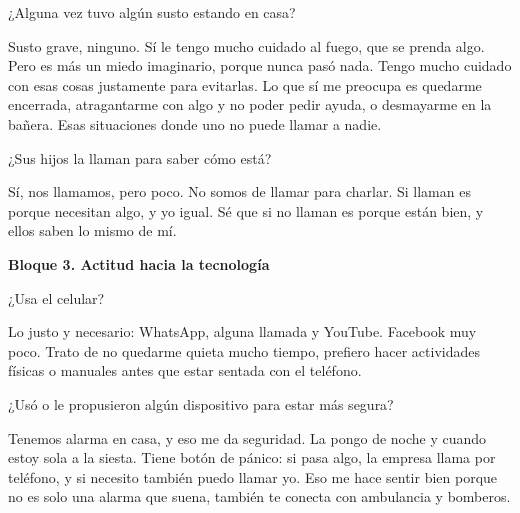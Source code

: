 \begin{description}[leftmargin=0cm, labelsep=0.5cm]

    \item[\textbf{Entrevistador:}] ¿Alguna vez tuvo algún susto estando en casa?

    \item[\textbf{Entrevistada:}] Susto grave, ninguno.
    Sí le tengo mucho cuidado al fuego, que se prenda algo.
    Pero es más un miedo imaginario, porque nunca pasó nada.
    Tengo mucho cuidado con esas cosas justamente para evitarlas.
    Lo que sí me preocupa es quedarme encerrada, atragantarme con algo y no poder pedir ayuda, o desmayarme en la bañera.
    Esas situaciones donde uno no puede llamar a nadie.

    \item[\textbf{Entrevistador:}] ¿Sus hijos la llaman para saber cómo está?

    \item[\textbf{Entrevistada:}] Sí, nos llamamos, pero poco.
    No somos de llamar para charlar.
    Si llaman es porque necesitan algo, y yo igual.
    Sé que si no llaman es porque están bien, y ellos saben lo mismo de mí.

\end{description}

\bigskip
\textbf{Bloque 3. Actitud hacia la tecnología}

\begin{description}[leftmargin=0cm, labelsep=0.5cm]

    \item[\textbf{Entrevistador:}] ¿Usa el celular?

    \item[\textbf{Entrevistada:}] Lo justo y necesario: WhatsApp, alguna llamada y YouTube.
    Facebook muy poco.
    Trato de no quedarme quieta mucho tiempo, prefiero hacer actividades físicas o manuales antes que estar sentada con el teléfono.

    \item[\textbf{Entrevistador:}] ¿Usó o le propusieron algún dispositivo para estar más segura?

    \item[\textbf{Entrevistada:}] Tenemos alarma en casa, y eso me da seguridad.
    La pongo de noche y cuando estoy sola a la siesta.
    Tiene botón de pánico: si pasa algo, la empresa llama por teléfono, y si necesito también puedo llamar yo.
    Eso me hace sentir bien porque no es solo una alarma que suena, también te conecta con ambulancia y bomberos.

\end{description}

